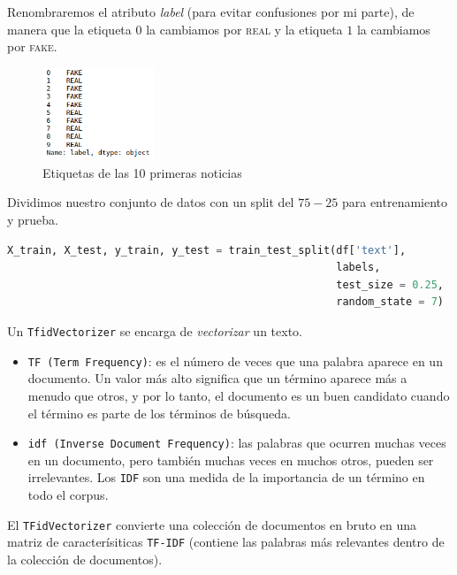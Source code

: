 \documentclass[letterpaper,11pt]{article}
\begin{document}
Renombraremos el atributo \textit{label} (para evitar confusiones por mi
parte), de manera que la etiqueta $0$ la cambiamos por \textsc{real} y la 
etiqueta $1$ la cambiamos por \textsc{fake}.

\begin{figure}[ht!]
    \centering
    \includegraphics[width=0.3\textwidth]{./imagenes/labels.png}
    \caption{Etiquetas de las 10 primeras noticias}
\end{figure} 

Dividimos nuestro conjunto de datos con un split del $75-25$ para entrenamiento 
y prueba. 

\begin{lstlisting}[language = Python]
X_train, X_test, y_train, y_test = train_test_split(df['text'], 
                                                    labels, 
                                                    test_size = 0.25, 
                                                    random_state = 7)
\end{lstlisting}

\newpage
Un \texttt{TfidVectorizer} se encarga de \textit{vectorizar} un texto. 
\begin{itemize}
    \item \texttt{TF (Term Frequency)}: es el número de veces que una 
    palabra aparece en un documento. Un valor más alto significa que un término 
    aparece más a menudo que otros, y por lo tanto, el documento es un buen 
    candidato cuando el término es parte de los términos de búsqueda.

    \item \texttt{idf (Inverse Document Frequency)}: las palabras que ocurren 
    muchas veces en un documento, pero también muchas veces en muchos otros,
    pueden ser irrelevantes. Los \texttt{IDF} son una medida de la importancia
    de un término en todo el corpus. 
\end{itemize}

El \texttt{TFidVectorizer} convierte una colección de documentos en bruto en 
una matriz de caracterísiticas \texttt{TF-IDF} (contiene las palabras más 
relevantes dentro de la colección de documentos).
\end{document}
